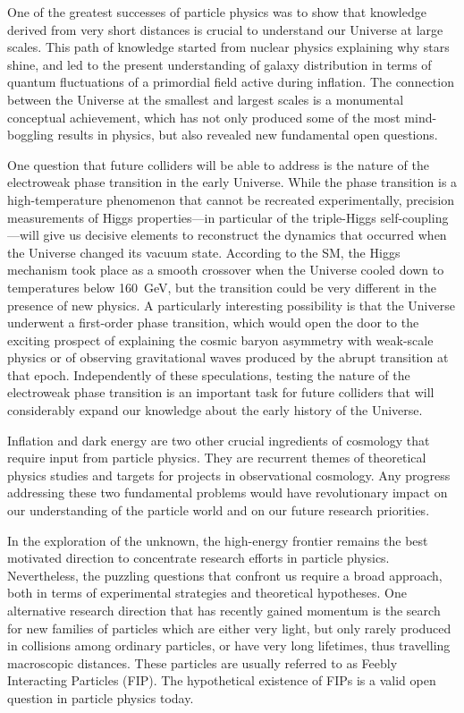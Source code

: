 \documentclass[../report.tex]{subfiles}
\begin{document}
\smallskip
\noindent
One of the greatest successes of particle physics was to show that knowledge derived from very short distances is crucial to understand our Universe at large scales. This path of knowledge started from nuclear physics explaining why stars shine,  and led to the present understanding of galaxy distribution in terms of quantum fluctuations of a primordial field active during inflation. The connection between the Universe at the smallest and largest scales is a monumental conceptual achievement, which has not only produced some of the most mind-boggling results in physics, but also revealed new fundamental open questions. 

One question that future colliders will be able to address is the nature of the electroweak phase transition in the early Universe. While the phase transition is a high-temperature phenomenon that cannot be recreated experimentally, precision measurements of Higgs properties---in particular of the triple-Higgs self-coupling---will give us decisive elements to reconstruct the dynamics that occurred when the Universe changed its vacuum state. According to the SM, the Higgs mechanism took place as a smooth crossover when the Universe cooled down to temperatures below 160~GeV, but the transition could be very different in the presence of new physics. A particularly interesting possibility is that the Universe underwent a first-order phase transition, which would open the door to the exciting prospect of explaining the cosmic baryon asymmetry with weak-scale physics or of observing gravitational waves produced by the abrupt transition at that epoch. Independently of these speculations, testing the nature of the electroweak phase transition is an important task for future colliders that will considerably expand our knowledge about the early history of the Universe.

Inflation and dark energy are two other crucial ingredients of cosmology that require input from particle physics. They are recurrent themes of theoretical physics studies and targets for projects in observational cosmology. Any progress addressing these two fundamental problems would have revolutionary impact on our understanding of the particle world and on our future research priorities. 

\medskip
{}

\smallskip
\noindent
 In the exploration of the unknown, the high-energy frontier remains the best motivated direction to concentrate research efforts in particle physics. Nevertheless, the puzzling questions that confront us require a broad approach, both in terms of experimental strategies and theoretical hypotheses. One alternative research direction that has recently gained momentum is the search for new families of particles which are either very light, but only rarely produced in collisions among ordinary particles, or have very long lifetimes, thus travelling macroscopic distances. These particles are usually referred to as Feebly Interacting Particles (FIP). The hypothetical existence of FIPs is a valid open question in particle physics today.
\end{document}
